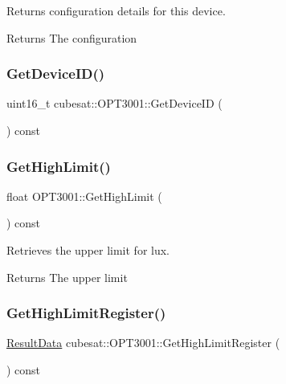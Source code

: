 Returns configuration details for this device. 

\begin{DoxyReturn}{Returns}
The configuration 
\end{DoxyReturn}
\mbox{\label{classcubesat_1_1OPT3001_adc2eb69ceb5e0f3448b06f199d2ec985}} 
\subsubsection{\texorpdfstring{Get\+Device\+I\+D()}{GetDeviceID()}}
{\footnotesize\ttfamily uint16\+\_\+t cubesat\+::\+O\+P\+T3001\+::\+Get\+Device\+ID (\begin{DoxyParamCaption}{ }\end{DoxyParamCaption}) const\hspace{0.3cm}{\ttfamily [inline]}}

\mbox{\label{classcubesat_1_1OPT3001_a014e0389a3877b2fb4536c925579afd0}} 
\subsubsection{\texorpdfstring{Get\+High\+Limit()}{GetHighLimit()}}
{\footnotesize\ttfamily float O\+P\+T3001\+::\+Get\+High\+Limit (\begin{DoxyParamCaption}{ }\end{DoxyParamCaption}) const}



Retrieves the upper limit for lux. 

\begin{DoxyReturn}{Returns}
The upper limit 
\end{DoxyReturn}
\mbox{\label{classcubesat_1_1OPT3001_a2d6066e4ab634e0c1fa8094ec220be44}} 
\subsubsection{\texorpdfstring{Get\+High\+Limit\+Register()}{GetHighLimitRegister()}}
{\footnotesize\ttfamily \hyperlink{unioncubesat_1_1OPT3001_1_1ResultData}{Result\+Data} cubesat\+::\+O\+P\+T3001\+::\+Get\+High\+Limit\+Register (\begin{DoxyParamCaption}{ }\end{DoxyParamCaption}) const\hspace{0.3cm}{\ttfamily [inline]}}

